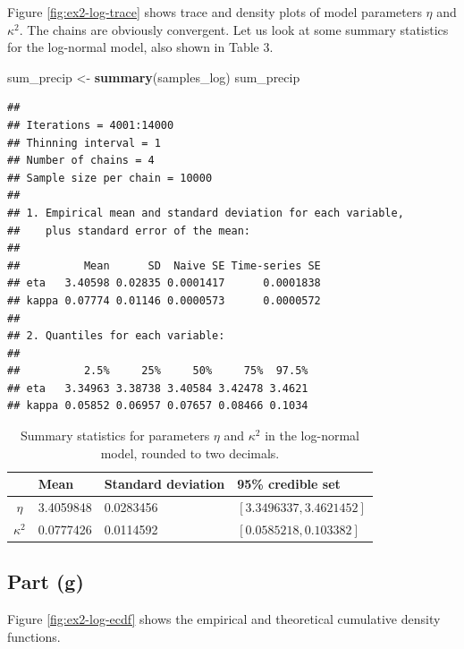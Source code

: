 \documentclass[
]{homework}
\newenvironment{Shaded}{\begin{snugshade}}{\end{snugshade}}
\newcommand{\FunctionTok}[1]{\textcolor[rgb]{0.13,0.29,0.53}{\textbf{#1}}}
\newcommand{\NormalTok}[1]{#1}
\newcommand{\OtherTok}[1]{\textcolor[rgb]{0.56,0.35,0.01}{#1}}
\begin{document}
Figure \ref{fig:ex2-log-trace} shows trace and density plots of model parameters \(\eta\) and \(\kappa^2\). The chains are obviously convergent.
Let us look at some summary statistics for the log-normal model, also shown in Table 3.

\begin{Shaded}
\begin{Highlighting}[]
\NormalTok{sum\_precip }\OtherTok{\textless{}{-}} \FunctionTok{summary}\NormalTok{(samples\_log)}
\NormalTok{sum\_precip}
\end{Highlighting}
\end{Shaded}

\begin{verbatim}
## 
## Iterations = 4001:14000
## Thinning interval = 1 
## Number of chains = 4 
## Sample size per chain = 10000 
## 
## 1. Empirical mean and standard deviation for each variable,
##    plus standard error of the mean:
## 
##          Mean      SD  Naive SE Time-series SE
## eta   3.40598 0.02835 0.0001417      0.0001838
## kappa 0.07774 0.01146 0.0000573      0.0000572
## 
## 2. Quantiles for each variable:
## 
##          2.5%     25%     50%     75%  97.5%
## eta   3.34963 3.38738 3.40584 3.42478 3.4621
## kappa 0.05852 0.06957 0.07657 0.08466 0.1034
\end{verbatim}

\begin{table}[H]
  \centering
  \begin{tabular}{clll}
    \toprule
          & Mean & Standard deviation & 95\% credible set \\
    \midrule
    $\eta$      & 3.4059848 & 0.0283456 & $[3.3496337, 3.4621452]$ \\
    $\kappa^2$  & 0.0777426 & 0.0114592 & $[0.0585218, 0.103382]$ \\
    \bottomrule
  \end{tabular}
  \label{tab:ex2-sum-stats-log}
  \caption{Summary statistics for parameters $\eta$ and $\kappa^2$ in the log-normal model, rounded to two decimals.}
\end{table}

\subsection{Part (g)}\label{part-g}

Figure \ref{fig:ex2-log-ecdf} shows the empirical and theoretical cumulative density functions.
\end{document}
